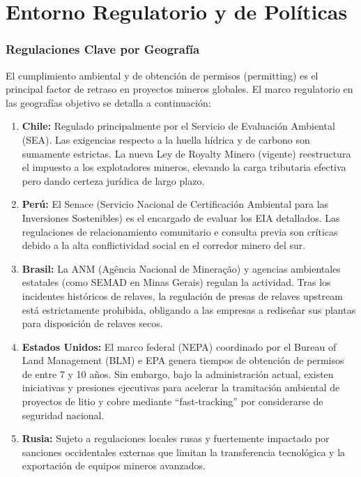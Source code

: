 \chapter{Entorno Regulatorio y de Políticas}

\subsection{Regulaciones Clave por Geografía}

El cumplimiento ambiental y de obtención de permisos (permitting) es el principal factor de retraso en proyectos mineros globales. El marco regulatorio en las geografías objetivo se detalla a continuación:

\begin{enumerate}
    \item \textbf{Chile:} Regulado principalmente por el Servicio de Evaluación Ambiental (SEA). Las exigencias respecto a la huella hídrica y de carbono son sumamente estrictas. La nueva Ley de Royalty Minero (vigente) reestructura el impuesto a los explotadores mineros, elevando la carga tributaria efectiva pero dando certeza jurídica de largo plazo.
    
    \item \textbf{Perú:} El Senace (Servicio Nacional de Certificación Ambiental para las Inversiones Sostenibles) es el encargado de evaluar los EIA detallados. Las regulaciones de relacionamiento comunitario e consulta previa son críticas debido a la alta conflictividad social en el corredor minero del sur.
    
    \item \textbf{Brasil:} La ANM (Agência Nacional de Mineração) y agencias ambientales estatales (como SEMAD en Minas Gerais) regulan la actividad. Tras los incidentes históricos de relaves, la regulación de presas de relaves upstream está estrictamente prohibida, obligando a las empresas a rediseñar sus plantas para disposición de relaves secos.
    
    \item \textbf{Estados Unidos:} El marco federal (NEPA) coordinado por el Bureau of Land Management (BLM) e EPA genera tiempos de obtención de permisos de entre 7 y 10 años. Sin embargo, bajo la administración actual, existen iniciativas y presiones ejecutivas para acelerar la tramitación ambiental de proyectos de litio y cobre mediante ``fast-tracking'' por considerarse de seguridad nacional.
    
    \item \textbf{Rusia:} Sujeto a regulaciones locales rusas y fuertemente impactado por sanciones occidentales externas que limitan la transferencia tecnológica y la exportación de equipos mineros avanzados.
\end{enumerate}

